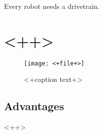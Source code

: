 \documentclass[../../main.tex]{subfiles}
\begin{document}
Every robot needs a drivetrain.

\section{<++>}

\begin{figure}
    \centering
    \texttt{[image: <+file+>]}
    \caption{<+caption text+>}
    \label{fig:<+label+>}
\end{figure}

\subsection{Advantages}
<++>
\end{document}

